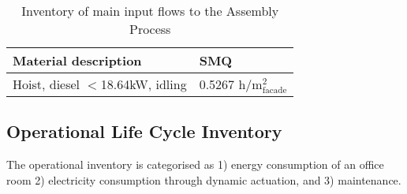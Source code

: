 \begin{description}
\begin{table}[H]
\centering
\begin{tabular}{ll}
\hline
Material description & SMQ \\ \hline
Hoist, diesel  ${<}$18.64kW, idling & 0.5267 ${\mathrm{h/m^2_{facade}}}$ \\
\hline
\end{tabular}
\caption{Inventory of main input flows to the Assembly Process}
\label{tab:AssemblyInv}
\end{table}

\end{description}

\subsection{Operational Life Cycle Inventory}
\label{ch:Meth:Opp}

The operational inventory is categorised as 1) energy consumption of an office room 2) electricity consumption through dynamic actuation, and 3) maintenance.

